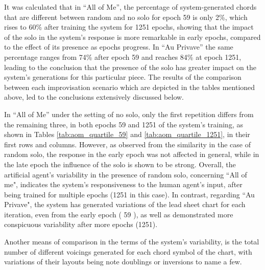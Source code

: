     It was calculated that in ``All of Me”, the percentage of system-generated chords that are different between random and no solo for epoch 59 is only 2\%, which rises to 60\% after training the system for 1251 epochs, showing that the impact of the solo in the system's response is more remarkable in early epochs, compared to the effect of its presence as epochs progress. In ``Au Privave” the same percentage ranges from 74\% after epoch 59 and reaches 84\% at epoch 1251, leading to the conclusion that the presence of the solo has greater impact on the system's generations for this particular piece. The results of the comparison between each improvisation scenario which are depicted in the tables mentioned above, led to the conclusions extensively discussed below.

    In ``All of Me” under the setting of no solo, only the first repetition differs from the remaining three, in both epochs 59 and 1251 of the system's training, as shown in Tables \ref{tab:aom_quartile_59} and \ref{tab:aom_quartile_1251}, in their first rows and columns. However, as observed from the similarity in the case of random solo, the response in the early epoch was not affected in general, while in the late epoch the influence of the solo is shown to be strong. Overall, the artificial agent's variability in the presence of random solo, concerning ``All of me", indicates the system's responsiveness to the human agent's input, after being trained for multiple epochs (1251 in this case). In contrast, regarding ``Au Privave", the system has generated variations of the lead sheet chart for each iteration, even from the early epoch ( 59 ), as well as demonstrated more conspicuous variability after more epochs (1251). 

    Another means of comparison in the terms of the system's variability, is the total number of different voicings generated for each chord symbol of the chart, with variations of their layouts being note doublings or inversions to name a few. 

